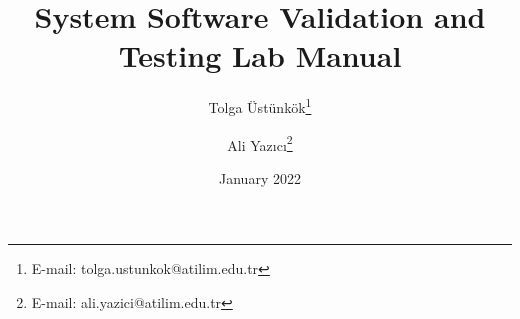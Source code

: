 \documentclass[paper=a4,fontsize=11,parskip=full,pagesize=auto,headsepline=true,chapterprefix=true,oneside]{scrbook}
\begin{document}
    \titlehead{Atılım University\\Department of Software Engineering}
    \title{System Software Validation and Testing Lab Manual}
    \author{Tolga Üstünkök\thanks{E-mail: tolga.ustunkok@atilim.edu.tr} \and Ali Yazıcı\thanks{E-mail: ali.yazici@atilim.edu.tr}}
    \date{January 2022}
    \publishers{Department of Software Engineering\\Atılım University}
    \lowertitleback{This lab manual was set with the help of {\KOMAScript} and {\LaTeX} and last compiled on {\today}. The document source can be found in \url{https://github.com/tustunkok/se344-lab-manual}.}
    \maketitle
    
    \frontmatter
    \tableofcontents
    \listoffigures
    \listoftables
    \lstlistoflistings
    
    \mainmatter
    
    
    
    
    
    
    
    
    \appendix
    
    
    \backmatter
    \printbibliography[heading=bibintoc]
\end{document}
